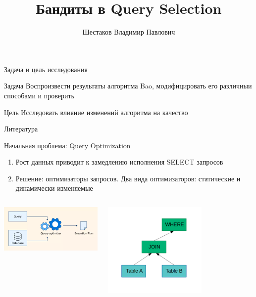 \documentclass{beamer}
\title[\hbox to 56mm{Bandits}]{ Бандиты в Query Selection }
\author[В.\,П. Шестаков]{Шестаков Владимир Павлович}
\institute{Московский физико-технический институт}
\date{\footnotesize
\par\smallskip\emph{Курс:} Автоматизация научных исследований
\par\smallskip\emph{Эксперт:} Ю.\,В.~Дорн
\par\smallskip\emph{Консультант:} И.\,М.~Латыпов
\par\bigskip\small 2025}
\begin{document}
\begin{frame}
\thispagestyle{empty}
\maketitle
\end{frame}
\begin{frame}{Задача и цель исследования}

\begin{block}{Задача}
  Воспроизвести результаты алгоритма Bao, модифицировать его различныи способами и проверить
\end{block}
\begin{block}{Цель}
  Исследовать влияние изменений алгоритма на качество
\end{block}

\end{frame}
\begin{frame}{Литература}
\nocite{bao}
\nocite{bandit-intro}
\printbibliography
\end{frame}
\begin{frame}{Начальная проблема: Query Optimization}
\begin{enumerate}
    \item
		Рост данных приводит к замедлению исполнения SELECT запросов

  \item
    Решение: оптимизаторы запросов. Два вида оптимизаторов: статические и динамически изменяемые
    \end{enumerate}

\begin{columns}[T]
\begin{center}
\includegraphics[width=5cm]{query-optimizer-structure.png}
\end{center}
\includegraphics[width=5cm]{query-plane-tree.png}
\end{columns}

\end{frame}
\end{document}
